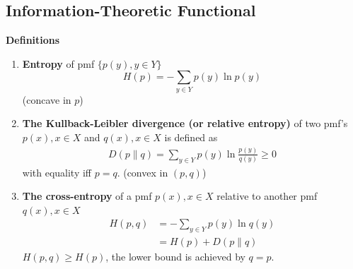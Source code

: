\documentclass[11pt,a4paper]{article}
\begin{document}
\subsection{Information-Theoretic Functional}
\textbf{Definitions}
\begin{enumerate}
    \item \textbf{Entropy} of pmf $\{p(y),y\in Y\}$ $$H(p)=-\sum_{y\in Y}p(y)\ln p(y)$$
    (concave in $p$)
    \item \textbf{The Kullback-Leibler divergence (or relative entropy)} of two pmf's $p(x), x\in X$ and $q(x), x\in X$ is defined as
    \begin{equation}
        \begin{aligned}
            D(p\| q)=\sum_{y\in Y}p(y)\ln\frac{p(y)}{q(y)}\geq 0
        \end{aligned}
        \nonumber
    \end{equation}
    with equality iff $p=q$. (convex in $(p,q)$)
    \item \textbf{The cross-entropy} of a pmf $p(x),x\in X$ relative to another pmf $q(x), x\in X$
    \begin{equation}
        \begin{aligned}
            H(p, q)&=-\sum_{y\in Y}p(y)\ln q(y)\\&=H(p)+D(p\| q)
        \end{aligned}
        \nonumber
    \end{equation}
    $H(p,q)\geq H(p)$, the lower bound is achieved by $q=p$.
\end{enumerate}
\end{document}
